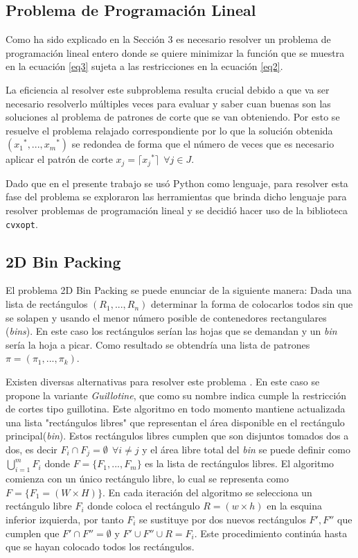 \documentclass[a4paper,10pt,twocolumn]{article}
\begin{document}
\subsection{Problema de Programación Lineal}
Como ha sido explicado en la Sección 3 es necesario resolver un problema de programación lineal entero donde se quiere minimizar la función que se muestra en la ecuación \eqref{eq3} sujeta a las restricciones en la ecuación \eqref{eq2}.

La eficiencia al resolver este subproblema resulta crucial debido a que va ser necesario resolverlo múltiples veces para evaluar y saber cuan buenas son las soluciones al problema de patrones de corte que se van obteniendo. Por esto se resuelve el problema relajado correspondiente por lo que la solución obtenida $({x_1}^*,...,{x_m}^*)$ se redondea de forma que el número de veces que es necesario aplicar el patrón de corte $x_j = \lceil {x_j}^* \rceil \ \ \forall j \in J$.

Dado que en el presente trabajo se usó Python como lenguaje, para resolver esta fase del problema se exploraron las herramientas que brinda dicho lenguaje para resolver problemas de programación lineal y se decidió hacer uso de la biblioteca \texttt{cvxopt}.

\subsection{2D Bin Packing}
El problema 2D Bin Packing se puede enunciar de la siguiente manera: Dada una lista de rectángulos $(R_1,...,R_n)$ determinar la forma de colocarlos todos sin que se solapen y usando el menor número posible de contenedores rectangulares (\textit{bins}). En este caso los rectángulos serían las hojas que se demandan y un \textit{bin} sería la hoja a picar. Como resultado se obtendría una lista de patrones $\pi = (\pi_1,...,\pi_k)$.

Existen diversas alternativas para resolver este problema \cite{11}. En este caso se propone la variante \textit{Guillotine}, que como su nombre indica cumple la restricción de cortes tipo guillotina. Este algoritmo en todo momento mantiene actualizada una lista "rectángulos libres" que representan el área disponible en el rectángulo principal(\textit{bin}). Estos rectángulos libres cumplen que son disjuntos tomados dos a dos, es decir $F_i \cap F_j = \emptyset \ \ \forall i\neq j $ y el área libre total del \textit{bin} se puede definir como $\bigcup\limits_{i=1}^{m} F_{i}$ donde $F = \{F_1,...,F_m\}$ es la lista de rectángulos libres. El algoritmo comienza con un único rectángulo libre, lo cual se representa como $F = \{F_1 = (W \times H)\}$. En cada iteración del algoritmo se selecciona un rectángulo libre $F_i$ donde coloca el rectángulo $R = (w \times h)$ en la esquina inferior izquierda, por tanto $F_i$ se sustituye por dos nuevos rectángulos $F',F''$ que cumplen que $F' \cap F'' = \emptyset$ y $F' \cup F'' \cup R = F_i$. Este procedimiento continúa hasta que se hayan colocado todos los rectángulos.
\end{document}
